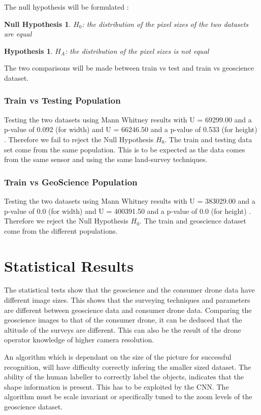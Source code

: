 \documentclass{article}
\newtheorem{hypothesis}{Hypothesis}
\newtheorem{nullhypothesis}{Null Hypothesis}
\begin{document}
The null hypothesis will be formulated :
\begin{nullhypothesis}
$H_0$: the distribution of the pixel sizes of the two datasets are equal
\end{nullhypothesis}
\begin{hypothesis}
$H_{A}$: the distribution of the pixel sizes is not equal
\end{hypothesis}

The two comparisons will be made between train vs test and train vs geoscience dataset.

\subsubsection{Train vs Testing Population}

Testing the two datasets using Mann Whitney results with U = 69299.00 and a p-value of 0.092 (for width) and U = 66246.50 and a p-value of 0.533 (for height) . Therefore we fail to reject the Null Hypothesis $H_0$. The train and testing data set come from the same population. This is to be expected as the data comes from the same sensor and using the same land-survey techniques.

\subsubsection{Train vs GeoScience Population}

Testing the two datasets using Mann Whitney results with U = 383029.00 and a p-value of 0.0 (for width) and U = 400391.50 and a p-value of 0.0 (for height) . Therefore we reject the Null Hypothesis $H_0$. The train and geoscience dataset come from the different populations. 

\section{Statistical Results}

The statistical tests show that the geoscience and the consumer drone data have different image sizes. This shows that the surveying techniques and parameters are different between geoscience data and consumer drone data. Comparing the geoscience images to that of the consumer drone, it can be deduced that the altitude of the surveys are different. This can also be the result of the drone operator knowledge of higher camera resolution.\newline

An algorithm which is dependant on the size of the picture for successful recognition, will have difficulty correctly infering the smaller sized dataset. The ability of the human labeller to correctly label the objects, indicates that the shape information is present. This has to be exploited by the CNN. The algorithm must be scale invariant or specifically tuned to the zoom levels of the geoscience dataset.\newline
\end{document}
